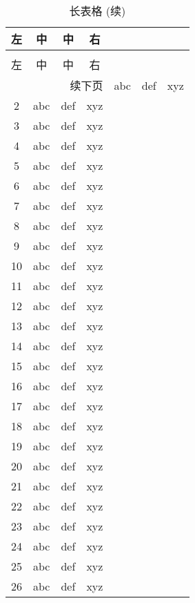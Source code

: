 \begin{center}
  \begin{longtable}{cccc}
    \caption{长表格}\label{tab:test-long}\\ %
    \toprule
    左 & 中 & 中 & 右\\
    \midrule
    \endfirsthead  %
    \caption[]{长表格 (续)}\\ %
    \toprule
    左 & 中 & 中 & 右\\
    \midrule
    \endhead  %
    \hline
    \multicolumn{4}{r}{\small 续下页}
    \endfoot  %
    \bottomrule
    \captionnote{这是个长表格.}
    \endlastfoot  %
    1  &  abc  &  def  &  xyz \\
    2  &  abc  &  def  &  xyz \\
    3  &  abc  &  def  &  xyz \\
    4  &  abc  &  def  &  xyz \\
    5  &  abc  &  def  &  xyz \\
    6  &  abc  &  def  &  xyz \\
    7  &  abc  &  def  &  xyz \\
    8  &  abc  &  def  &  xyz \\
    9  &  abc  &  def  &  xyz \\
    10 &  abc  &  def  &  xyz \\
    11 &  abc  &  def  &  xyz \\
    12 &  abc  &  def  &  xyz \\
    13 &  abc  &  def  &  xyz \\
    14 &  abc  &  def  &  xyz \\
    15 &  abc  &  def  &  xyz \\
    16 &  abc  &  def  &  xyz \\
    17 &  abc  &  def  &  xyz \\
    18 &  abc  &  def  &  xyz \\
    19 &  abc  &  def  &  xyz \\
    20 &  abc  &  def  &  xyz \\
    21 &  abc  &  def  &  xyz \\
    22 &  abc  &  def  &  xyz \\
    23 &  abc  &  def  &  xyz \\
    24 &  abc  &  def  &  xyz \\
    25 &  abc  &  def  &  xyz \\
    26 &  abc  &  def  &  xyz \\

\end{longtable}
\end{center}
